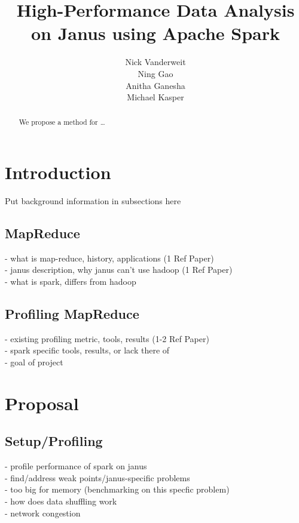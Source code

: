 \documentclass{article}
\title{High-Performance Data Analysis on Janus using Apache Spark}
\author{Nick Vanderweit \\
        Ning Gao \\
        Anitha Ganesha \\
        Michael Kasper}
\begin{document}
\maketitle

\begin{abstract}
We propose a method for \ldots
\end{abstract}

\section*{Introduction}
Put background information in subsections here \cite{fenn-dtk2006b}

\subsection*{MapReduce}

- what is map-reduce, history, applications (1 Ref Paper) \\
- janus description, why janus can't use hadoop (1 Ref Paper) \\
- what is spark, differs from hadoop \\

\subsection*{Profiling MapReduce}

- existing profiling metric, tools, results (1-2 Ref Paper) \\
- spark specific tools, results, or lack there of \\
- goal of project \\

\section*{Proposal}

\subsection*{Setup/Profiling}

- profile performance of spark on janus \\
- find/address weak points/janus-specific problems \\
- too big for memory (benchmarking on this specfic problem) \\
- how does data shuffling work \\
- network congestion \\
\end{document}
